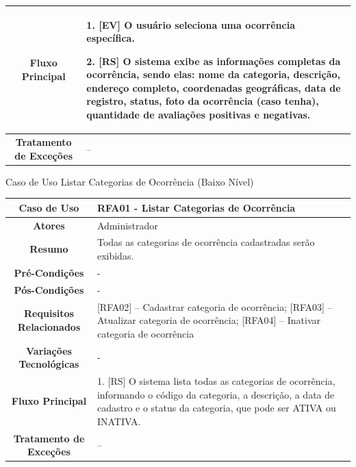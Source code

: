 \begin{apendicesenv}
\begin{quadro}[htb]
\begin{tabular}{|c|p{11cm}|}
		\textbf{Fluxo Principal} &
		\parbox[t]{11cm}{
			\raggedright
			1. [EV] O usuário seleciona uma ocorrência específica.\par
			2. [RS] O sistema exibe as informações completas da ocorrência, sendo elas: nome da categoria, descrição, endereço completo, coordenadas geográficas, data de registro, status, foto da ocorrência (caso tenha), quantidade de avaliações positivas e negativas.
		}
		\\ \hline
		
		\textbf{Tratamento de Exceções} &
		\parbox[t]{11cm}{
			\raggedright
			--
		}
		\\ \hline
	\end{tabular}
	
\end{quadro}

\begin{quadro}[htb]
	\centering
	\caption{\label{quadro_rfa01}Caso de Uso Listar Categorias de Ocorrência (Baixo Nível)}
	\small
	\renewcommand{\arraystretch}{1.1}
	
	\begin{tabular}{|c|p{11cm}|}
		\hline
		\textbf{Caso de Uso} & RFA01 - Listar Categorias de Ocorrência \\ \hline
		\textbf{Atores} & Administrador \\ \hline
		\textbf{Resumo} & Todas as categorias de ocorrência cadastradas serão exibidas. \\ \hline
		\textbf{Pré-Condições} & - \\ \hline
		\textbf{Pós-Condições} & - \\ \hline
		\textbf{Requisitos Relacionados} & [RFA02] -- Cadastrar categoria de ocorrência; [RFA03] -- Atualizar categoria de ocorrência; [RFA04] -- Inativar categoria de ocorrência \\ \hline
		\textbf{Variações Tecnológicas} & - \\ \hline
		
		\textbf{Fluxo Principal} &
		\parbox[t]{11cm}{
			\raggedright
			1. [RS] O sistema lista todas as categorias de ocorrência, informando o código da categoria, a descrição, a data de cadastro e o status da categoria, que pode ser ATIVA ou INATIVA.
		}
		\\ \hline
		
		\textbf{Tratamento de Exceções} &
		\parbox[t]{11cm}{
			\raggedright
			--
		}
		\\ \hline
	\end{tabular}
	

\end{quadro}
\end{apendicesenv}
